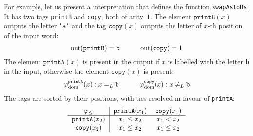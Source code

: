 For example, let us present a  interpretation that defines the function \texttt{swapAsToBs}. 
It has two tags \texttt{printB} and \texttt{copy}, both of arity~$1$. 
The element $\mathtt{printB}(x)$ outputs the letter \texttt{'a'} and the tag $\mathtt{copy}(x)$
outputs the letter of $x$-th position of the input word:
\[
\begin{tabular}{ccc}
    $\text{out}(\mathtt{printB}) = \mathtt{b}$ & \ \ \ & $\text{out}(\mathtt{copy}) = 1$ \\
\end{tabular}
\]
The element $\mathtt{printA}(x)$ is present in the output if $x$ is labelled with the letter \texttt{b}
in the input, otherwise the element $\mathtt{copy}(x)$ is present:
\[
\begin{tabular}{ccc}
    $\varphi_{\text{dom}}^{\mathtt{printA}}(x) : x =_L \mathtt{b}$ & \ \ \  &$\varphi_{\text{dom}}^{\mathtt{copy}}(x) : x \neq_L \mathtt{b}$ \\
\end{tabular}
\]
The tags are sorted by their positions, with ties resolved in favour of \texttt{printA}:
\[ 
\begin{tabular}{c|cc}
    $\varphi_{\leq}$ & $\mathtt{printA}(x_1)$ & $\mathtt{copy}(x_1)$ \\
    \hline
    $\mathtt{printA}(x_2)$ & $x_1 \leq x_2$ & $x_1 < x_2$ \\
    $\mathtt{copy}(x_2)$ & $x_1 \leq x_2$ & $x_1 \leq x_2$ \\
\end{tabular}
\]

